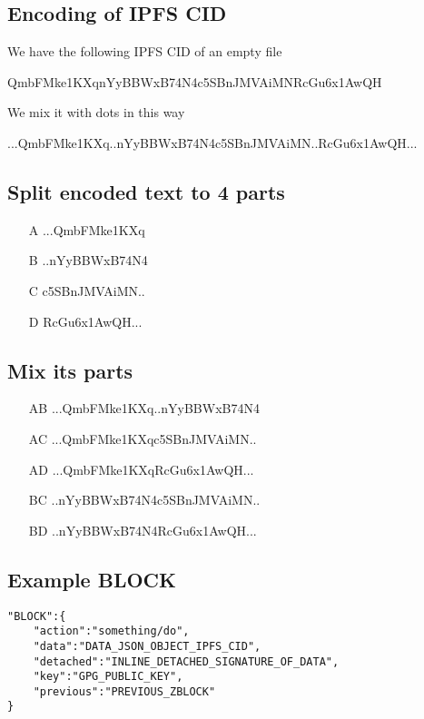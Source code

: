 \documentclass[10pt,a4paper]{paper}
\begin{document}
\subsection{Encoding of IPFS CID}\label{example-encoding}

We have the following IPFS CID of an empty file

QmbFMke1KXqnYyBBWxB74N4c5SBnJMVAiMNRcGu6x1AwQH

We mix it with dots in this way

...QmbFMke1KXq..nYyBBWxB74N4c5SBnJMVAiMN..RcGu6x1AwQH...

\subsection{Split encoded text to 4 parts}\label{example-split}

\begin{enumerate}
	\item[A] ...QmbFMke1KXq
	\item[B] ..nYyBBWxB74N4
	\item[C] c5SBnJMVAiMN..
	\item[D] RcGu6x1AwQH...
\end{enumerate}



\subsection{Mix its parts}\label{example-multiplex}
\begin{enumerate}
	\item[AB] ...QmbFMke1KXq..nYyBBWxB74N4
	\item[AC] ...QmbFMke1KXqc5SBnJMVAiMN.. 
	\item[AD] ...QmbFMke1KXqRcGu6x1AwQH...
	\item[BC] ..nYyBBWxB74N4c5SBnJMVAiMN..
	\item[BD] ..nYyBBWxB74N4RcGu6x1AwQH...
\end{enumerate}

\subsection{Example BLOCK}\label{example-block}
\begin{verbatim}
"BLOCK":{
    "action":"something/do",
    "data":"DATA_JSON_OBJECT_IPFS_CID",
    "detached":"INLINE_DETACHED_SIGNATURE_OF_DATA",
    "key":"GPG_PUBLIC_KEY",
    "previous":"PREVIOUS_ZBLOCK"
}
\end{verbatim}
\end{document}
